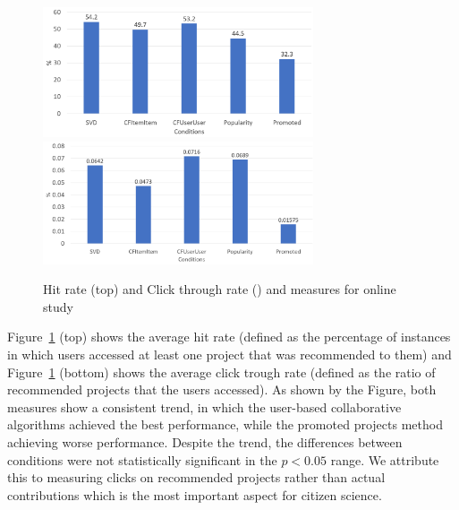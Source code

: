 \documentclass[letterpaper]{article} %
\begin{document}
\begin{figure}[t]
     \centering
    \includegraphics[width=8cm]{Figs/ctr.png}
        \includegraphics[width=8cm]{Figs/hit.png}
    \caption{Hit rate  (top) and Click through rate () and measures for  online study}
     \label{fig:hit}%
 \end{figure}

  Figure~\ref{fig:hit} (top) shows the  average hit rate (defined as the  percentage of instances in which users accessed at least one project that was recommended
  to them) and Figure~\ref{fig:hit} (bottom)  shows the  average click trough rate (defined as the ratio of recommended
  projects that the users accessed). As shown by the Figure, both  measures show a consistent trend, in which the
  user-based collaborative algorithms achieved the best performance, while the  promoted projects method achieving
  worse performance. Despite the trend, the differences between conditions were not statistically
  significant in the $p<0.05$ range. We attribute this  to measuring  clicks on recommended projects rather than  actual contributions
  which is the most important aspect for citizen science.
\end{document}

